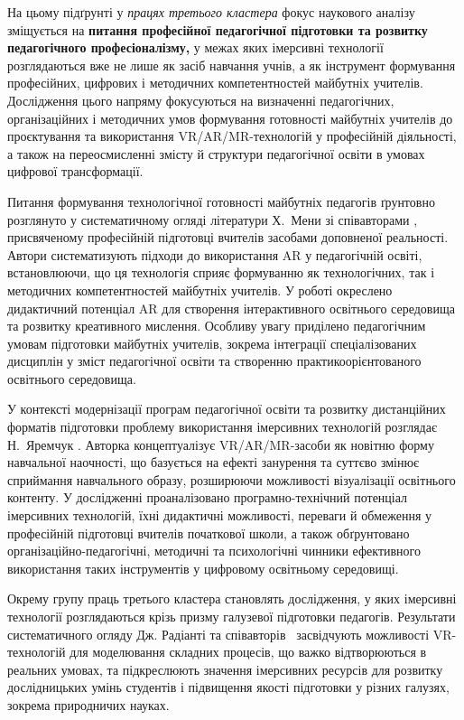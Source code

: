 
На цьому підґрунті у \emph{працях третього кластера} фокус наукового аналізу зміщується на \textbf{питання професійної педагогічної підготовки та розвитку педагогічного професіоналізму,} у межах яких імерсивні технології розглядаються вже не лише як засіб навчання учнів, а як інструмент формування професійних, цифрових і методичних компетентностей майбутніх учителів. Дослідження цього напряму фокусуються на визначенні педагогічних, організаційних і методичних умов формування готовності майбутніх учителів до проєктування та використання VR/AR/MR-технологій у професійній діяльності, а також на переосмисленні змісту й структури педагогічної освіти в умовах цифрової трансформації.

Питання формування технологічної готовності майбутніх педагогів ґрунтовно розглянуто у систематичному огляді літератури Х.~Мени зі співавторами \cite{Shevchuk2024Readiness}, присвяченому професійній підготовці вчителів засобами доповненої реальності. Автори систематизують підходи до використання AR у педагогічній освіті, встановлюючи, що ця технологія сприяє формуванню як технологічних, так і методичних компетентностей майбутніх учителів. У роботі окреслено дидактичний потенціал AR для створення інтерактивного освітнього середовища та розвитку креативного мислення. Особливу увагу приділено педагогічним умовам підготовки майбутніх учителів, зокрема інтеграції спеціалізованих дисциплін у зміст педагогічної освіти та створенню практикоорієнтованого освітнього середовища.

У контексті модернізації програм педагогічної освіти та розвитку дистанційних форматів підготовки проблему використання імерсивних технологій розглядає Н.~Яремчук \cite{Omelchuk2024Secondary}. Авторка концептуалізує VR/AR/MR-засоби як новітню форму навчальної наочності, що базується на ефекті занурення та суттєво змінює сприймання навчального образу, розширюючи можливості візуалізації освітнього контенту. У дослідженні проаналізовано програмно-технічний потенціал імерсивних технологій, їхні дидактичні можливості, переваги й обмеження у професійній підготовці вчителів початкової школи, а також обґрунтовано організаційно-педагогічні, методичні та психологічні чинники ефективного використання таких інструментів у цифровому освітньому середовищі.

Окрему групу праць третього кластера становлять дослідження, у яких імерсивні технології розглядаються крізь призму галузевої підготовки педагогів. Результати систематичного огляду Дж. Радіанті та співавторів~\cite{Radianti2020VR} засвідчують можливості VR-технологій для моделювання складних процесів, що важко відтворюються в реальних умовах, та підкреслюють значення імерсивних ресурсів для розвитку дослідницьких умінь студентів і підвищення якості підготовки у різних галузях, зокрема природничих науках.

